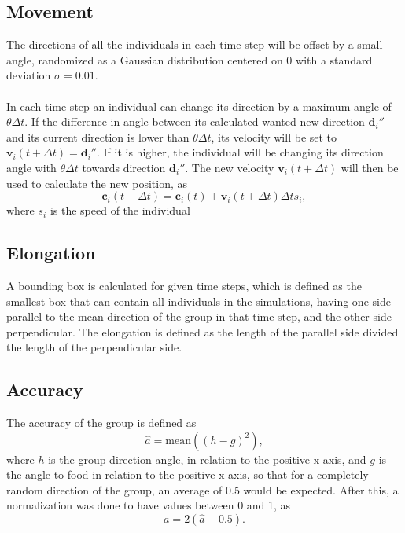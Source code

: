 \subsection{Movement} %
\label{sub:movement}
The directions of all the individuals in each time step will be offset by a small angle, randomized as a Gaussian distribution centered on 0 with a standard deviation $\sigma = 0.01$.
\\\\
In each time step an individual can change its direction by a maximum angle of $\theta \Delta t$. 
If the difference in angle between its calculated wanted new direction $\boldsymbol{d}_i''$ and its current direction is lower than $\theta \Delta t$, its velocity will be set to $\boldsymbol{v}_i(t + \Delta t) = \boldsymbol{d}_i''$.
If it is higher, the individual will be changing its direction angle with $\theta \Delta t$ towards direction $\boldsymbol{d}_i''$. 
The new velocity $\boldsymbol{v}_i(t + \Delta t)$ will then be used to calculate the new position, as 
\begin{equation}
	\boldsymbol{c}_i(t+\Delta t) = \boldsymbol{c}_i(t) + \boldsymbol{v}_i(t + \Delta t)\Delta t s_i,
\end{equation}
where $s_i$ is the speed of the individual

\subsection{Elongation} %
\label{sub:elongation}
A bounding box is calculated for given time steps, which is defined as the smallest box that can contain all individuals in the simulations, having one side parallel to the mean direction of the group in that time step, and the other side perpendicular.
The elongation is defined as the length of the parallel side divided the length of the perpendicular side.

\subsection{Accuracy} %
\label{sub:accuracy}
The accuracy of the group is defined as 
\begin{equation}
	\hat{a} = \text{mean} ((h - g)^2),
\end{equation}
where $h$ is the group direction angle, in relation to the positive x-axis, and $g$ is the angle to food in relation to the positive x-axis, so that for a completely random direction of the group, an average of 0.5 would be expected. After this, a normalization was done to have values between 0 and 1, as
\begin{equation}
	a = 2(\hat{a} - 0.5).
\end{equation}
